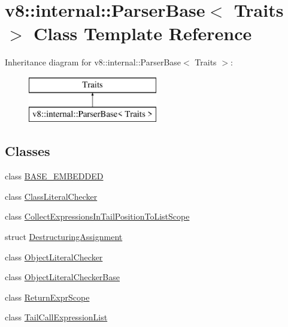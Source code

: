 \hypertarget{classv8_1_1internal_1_1_parser_base}{}\section{v8\+:\+:internal\+:\+:Parser\+Base$<$ Traits $>$ Class Template Reference}
\label{classv8_1_1internal_1_1_parser_base}
Inheritance diagram for v8\+:\+:internal\+:\+:Parser\+Base$<$ Traits $>$\+:\begin{figure}[H]
\begin{center}
\leavevmode
\includegraphics[height=2.000000cm]{classv8_1_1internal_1_1_parser_base}
\end{center}
\end{figure}
\subsection*{Classes}
\begin{DoxyCompactItemize}
\item 
class \hyperlink{classv8_1_1internal_1_1_parser_base_1_1_b_a_s_e___e_m_b_e_d_d_e_d}{B\+A\+S\+E\+\_\+\+E\+M\+B\+E\+D\+D\+ED}
\item 
class \hyperlink{classv8_1_1internal_1_1_parser_base_1_1_class_literal_checker}{Class\+Literal\+Checker}
\item 
class \hyperlink{classv8_1_1internal_1_1_parser_base_1_1_collect_expressions_in_tail_position_to_list_scope}{Collect\+Expressions\+In\+Tail\+Position\+To\+List\+Scope}
\item 
struct \hyperlink{structv8_1_1internal_1_1_parser_base_1_1_destructuring_assignment}{Destructuring\+Assignment}
\item 
class \hyperlink{classv8_1_1internal_1_1_parser_base_1_1_object_literal_checker}{Object\+Literal\+Checker}
\item 
class \hyperlink{classv8_1_1internal_1_1_parser_base_1_1_object_literal_checker_base}{Object\+Literal\+Checker\+Base}
\item 
class \hyperlink{classv8_1_1internal_1_1_parser_base_1_1_return_expr_scope}{Return\+Expr\+Scope}
\item 
class \hyperlink{classv8_1_1internal_1_1_parser_base_1_1_tail_call_expression_list}{Tail\+Call\+Expression\+List}
\end{DoxyCompactItemize}
